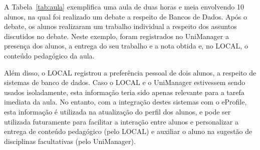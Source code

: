 
A Tabela~\ref{tab:aula} exemplifica uma aula de duas horas e meia envolvendo 10 alunos, na qual foi realizado um debate a respeito de Bancos de Dados. Após o debate, os alunos realizaram um trabalho individual a respeito dos assuntos discutidos no debate. Neste exemplo, foram registrados no UniManager a presença dos alunos, a entrega do seu trabalho e a nota obtida e, no LOCAL, o conteúdo pedagógico da aula.

Além disso, o LOCAL registrou a preferência pessoal de dois alunos, a respeito de sistemas de banco de dados. Caso o LOCAL e o UniManager estivessem sendo usados isoladamente, esta informação teria sido apenas relevante para a tarefa imediata da aula. No entanto, com a integração destes sistemas com o eProfile, esta informação é utilizada na atualização do perfil dos alunos, e pode ser utilizada futuramente para facilitar a interação entre alunos e personalizar a entrega de conteúdo pedagógico (pelo LOCAL) e auxiliar o aluno na sugestão de disciplinas facultativas (pelo UniManager).

